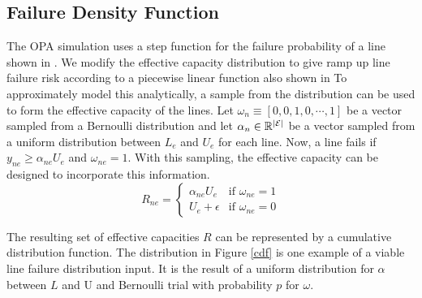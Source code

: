 \subsection*{Failure Density Function}
The OPA simulation uses a step function for the failure probability of a line shown in .  We modify the effective capacity distribution to give ramp up line failure risk according to a piecewise linear function also shown in    To approximately model this analytically, a sample from the distribution can be used to form the effective capacity of the lines.  Let $\omega_n \equiv\left[ 0, 0, 1, 0, \cdots, 1\right]$  be a vector sampled from a Bernoulli distribution and let $\alpha_n \in \mathbb{R}^{|\mathcal{E}|}$ be a vector sampled from a uniform distribution between $L_e$ and $U_e$ for each line.  Now, a line fails if $y_{ne} \ge \alpha_{ne} U_e$ and $\omega_{ne} =1$.  With this sampling, the effective capacity can be designed to incorporate this information.    
\begin{equation}
 R_{ne} = 
 \left\{ 
	\begin{array}{lr}
				\alpha_{ne} U_e & \mbox{if } \omega_{ne}=1\\
			  U_e + \epsilon & \mbox{if } \omega_{ne}=0
	\end{array}
 \right. \label{r}
\end{equation}

The resulting set of effective capacities $R$ can be represented by a cumulative distribution function. The distribution in Figure \ref{cdf} is one example of a viable line failure distribution input.  It is the result of a uniform distribution for $\alpha$ between $L$ and U and Bernoulli trial with probability $p$ for $\omega$.  


